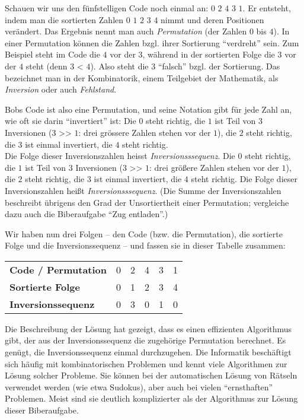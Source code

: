 {{Schauen wir uns den fünfstelligen Code noch einmal an:  $0$ $2$ $4$ $3$ $1$.
Er entsteht, indem man die sortierten Zahlen $0$ $1$ $2$ $3$ $4$ nimmt und deren Positionen verändert.  Das Ergebnis nennt man auch \emph{Permutation} (der Zahlen $0$ bis $4$).
In einer Permutation können die Zahlen bzgl. ihrer Sortierung \enquote{verdreht} sein.
Zum Beispiel steht im Code die $4$ vor der $3$, während in der sortierten Folge die $3$ vor der $4$ steht (denn $3$ < $4$).
Also steht die $3$ \enquote{falsch} bzgl. der Sortierung. Das bezeichnet man in der Kombinatorik, einem Teilgebiet der Mathematik, als \emph{Inversion} oder auch \emph{Fehlstand}.

Bobs Code ist also eine Permutation, und seine Notation gibt für jede Zahl an, wie oft sie darin \enquote{invertiert} ist:
Die $0$ steht richtig, die $1$ ist Teil von $3$ Inversionen ($3$ >\textcompwordmark{}> $1$: drei grössere Zahlen stehen vor der $1$),
die $2$ steht richtig, die $3$ ist einmal invertiert, die $4$ steht richtig. \\
Die Folge dieser Inversionszahlen heisst \emph{Inversionsssequenz}.
Die $0$ steht richtig, die $1$ ist Teil von $3$ Inversionen ($3$ >\textcompwordmark{}> $1$: drei größere Zahlen stehen vor der $1$),
die $2$ steht richtig, die $3$ ist einmal invertiert, die $4$ steht richtig.
Die Folge dieser Inversionszahlen heißt \emph{Inversionsssequenz}.
(Die Summe der Inversionszahlen beschreibt übrigens den Grad der Unsortiertheit einer Permutation; vergleiche dazu auch die Biberaufgabe \enquote{Zug entladen}.)

Wir haben nun drei Folgen – den Code (bzw. die Permutation), die sortierte Folge und die Inversionssequenz – und fassen sie in dieser Tabelle zusammen:

\begin{adjustwidth}{1.5em}{0em}
\begin{tabular}{ @{} l l l l l l @{} }
  \textbf{Code / Permutation} & 0 & 2 & 4 & 3 & 1 \\ 
  \textbf{Sortierte Folge} & 0 & 1 & 2 & 3 & 4 \\ 
  \textbf{Inversionssequenz} & 0 & 3 & 0 & 1 & 0
\end{tabular}


\end{adjustwidth}

Die Beschreibung der Lösung hat gezeigt, dass es einen effizienten Algorithmus gibt, der aus der Inversionssequenz die zugehörige Permutation berechnet. Es genügt, die Inversionssequenz einmal durchzugehen. Die Informatik beschäftigt sich häufig mit kombinatorischen Problemen und kennt viele Algorithmen zur Lösung solcher Probleme. Sie können bei der automatischen Lösung von Rätseln verwendet werden (wie etwa Sudokus), aber auch bei vielen \enquote{ernsthaften} Problemen. Meist sind sie deutlich komplizierter als der Algorithmus zur Lösung dieser Biberaufgabe.



}}
